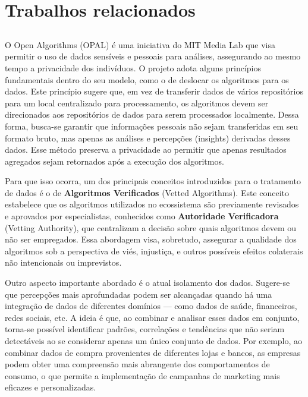 \chapter{Trabalhos relacionados}

\section{}

O Open Algorithms (OPAL) é uma iniciativa do MIT Media Lab que visa permitir o uso de dados sensíveis e pessoais para análises, assegurando ao mesmo tempo a privacidade dos indivíduos. O projeto adota alguns princípios fundamentais dentro do seu modelo, como o de deslocar os algoritmos para os dados. Este princípio sugere que, em vez de transferir dados de vários repositórios para um local centralizado para processamento, os algoritmos devem ser direcionados aos repositórios de dados para serem processados localmente. Dessa forma, busca-se garantir que informações pessoais não sejam transferidas em seu formato bruto, mas apenas as análises e percepções (insights) derivadas desses dados. Esse método preserva a privacidade ao permitir que apenas resultados agregados sejam retornados após a execução dos algoritmos.

Para que isso ocorra, um dos principais conceitos introduzidos para o tratamento de dados é o de \textbf{Algoritmos Verificados} (Vetted Algorithms). Este conceito estabelece que os algoritmos utilizados no ecossistema são previamente revisados e aprovados por especialistas, conhecidos como \textbf{Autoridade Verificadora} (Vetting Authority), que centralizam a decisão sobre quais algoritmos devem ou não ser empregados. Essa abordagem visa, sobretudo, assegurar a qualidade dos algoritmos sob a perspectiva de viés, injustiça, e outros possíveis efeitos colaterais não intencionais ou imprevistos.

Outro aspecto importante abordado é o atual isolamento dos dados. Sugere-se que percepções mais aprofundadas podem ser alcançadas quando há uma integração de dados de diferentes domínios — como dados de saúde, financeiros, redes sociais, etc. A ideia é que, ao combinar e analisar esses dados em conjunto, torna-se possível identificar padrões, correlações e tendências que não seriam detectáveis ao se considerar apenas um único conjunto de dados. Por exemplo, ao combinar dados de compra provenientes de diferentes lojas e bancos, as empresas podem obter uma compreensão mais abrangente dos comportamentos de consumo, o que permite a implementação de campanhas de marketing mais eficazes e personalizadas.



